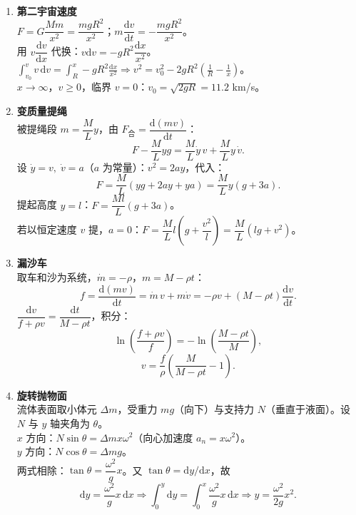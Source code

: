 \documentclass[12pt]{article}
\begin{document}
\begin{enumerate}[label=\textbf{例\arabic*.}, leftmargin=*]
\item \textbf{第二宇宙速度}\\
$F = G\dfrac{Mm}{x^2} = \dfrac{mgR^2}{x^2}$；$m\dfrac{\mathrm{d}v}{\mathrm{d}t} = -\dfrac{mgR^2}{x^2}$。\\
用 $v\dfrac{\mathrm{d}v}{\mathrm{d}x}$ 代换：$v\mathrm{d}v = -gR^2 \dfrac{\mathrm{d}x}{x^2}$。\\
$\displaystyle\int_{v_0}^{v} v\,\mathrm{d}v = \int_R^x -gR^2\frac{\mathrm{d}x}{x^2} \Rightarrow v^2 = v_0^2 - 2gR^2\!\left(\frac{1}{R} - \frac{1}{x}\right)$。\\
$x\to\infty$，$v\ge0$，临界 $v=0$：$v_0 = \sqrt{2gR} = 11.2$ km/s。

\item \textbf{变质量提绳}\\
被提绳段 $m = \dfrac{M}{L}y$，由 $F_{\text{合}} = \dfrac{\mathrm{d}(mv)}{\mathrm{d}t}$：
\[
  F - \frac{M}{L}yg = \frac{M}{L}\dot{y}\,v + \frac{M}{L}y\,\dot{v}.
\]
设 $\dot y = v,\; \dot v = a$（$a$ 为常量）：$v^2 = 2ay$，代入：
\[
  F = \frac{M}{L}(yg + 2ay + ya) = \frac{M}{L}y(g + 3a).
\]
提起高度 $y=l$：$F = \dfrac{Ml}{L}(g + 3a)$。\\
若以恒定速度 $v$ 提，$a=0$：$F = \dfrac{M}{L}l(g + \dfrac{v^2}{l}) = \dfrac{M}{L}(lg + v^2)$。

\item \textbf{漏沙车}\\
取车和沙为系统，$\dot{m} = -\rho$，$m = M - \rho t$：
\[
  f = \frac{\mathrm{d}(mv)}{\mathrm{d}t} = \dot{m}\,v + m\dot{v} = -\rho v + (M - \rho t)\frac{\mathrm{d}v}{\mathrm{d}t}.
\]
$\dfrac{\mathrm{d}v}{f + \rho v} = \dfrac{\mathrm{d}t}{M - \rho t}$，积分：
\[
  \ln\!\left(\frac{f + \rho v}{f}\right) = -\ln\!\left(\frac{M - \rho t}{M}\right),
\]
\[
  v = \frac{f}{\rho}\!\left(\frac{M}{M - \rho t} - 1\right).
\]

\item \textbf{旋转抛物面}\\
流体表面取小体元 $\Delta m$，受重力 $mg$（向下）与支持力 $N$（垂直于液面）。设 $N$ 与 $y$ 轴夹角为 $\theta$。\\
$x$ 方向：$N\sin\theta = \Delta m x\omega^2$（向心加速度 $a_n = x\omega^2$）。\\
$y$ 方向：$N\cos\theta = \Delta m g$。\\
两式相除：$\tan\theta = \dfrac{\omega^2}{g}x$。又 $\tan\theta = \mathrm{d}y/\mathrm{d}x$，故
\[
  \mathrm{d}y = \frac{\omega^2}{g}x\,\mathrm{d}x \Rightarrow \int_0^y \mathrm{d}y = \int_0^x \frac{\omega^2}{g}x\,\mathrm{d}x \Rightarrow y = \frac{\omega^2}{2g}x^2.
\]


\end{enumerate}
\end{document}

